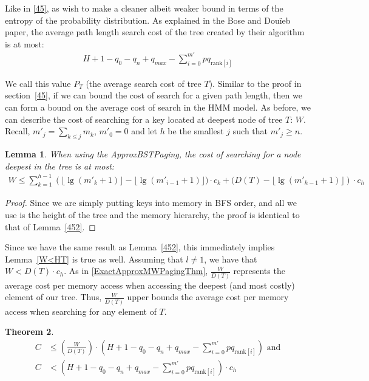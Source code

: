 \documentclass[letterpaper,12pt,titlepage,oneside,final]{book}
\theoremstyle{plain}
\newtheorem{thm}{Theorem}[section]
\newtheorem{lem}[thm]{Lemma}
\begin{document}
Like in \ref{45}, as wish to make a cleaner albeit weaker bound in terms of the entropy of the probability distribution. As explained in the Bose and Dou\"{i}eb paper, the average path length search cost of the tree created by their algorithm is at most: \cite{bose2009efficient}
\begin{align*}
H + 1 - q_0 - q_n + q_{max} - \sum_{i=0}^{m'} pq_{\text{rank}[i]}
\end{align*}

We call this value $P_T$ (the average search cost of tree $T$). Similar to the proof in section~\ref{45}, if we can bound the cost of search for a given path length, then we can form a bound on the average cost of search in the HMM model. As before, we can describe the cost of searching for a key located at deepest node of tree $T$: $W$. Recall, $m'_j = \sum_{k \leq j} m_k$, $m'_0 = 0$ and let $h$ be the smallest $j$ such that $m'_j \geq n$.

\begin{lem} 
When using the ApproxBSTPaging, the cost of searching for a node deepest in the tree is at most:
\begin{align*}
W \leq \sum_{k=1}^{h-1} \left(\lfloor \lg(m'_k+1) \rfloor - \lfloor \lg(m'_{i-1}+1) \rfloor)\cdot c_k+ (D(T) - \lfloor \lg(m'_{h-1}+1) \rfloor \right)\cdot c_h
\end{align*}
\end{lem}

\begin{proof}
Since we are simply putting keys into memory in BFS order, and all we use is the height of the tree and the memory hierarchy, the proof is identical to that of Lemma~\ref{452}.
\end{proof}

Since we have the same result as Lemma~\ref{452}, this immediately implies Lemma~\ref{W<HT} is true as well. Assuming that $l \neq 1$, we have that $W<D(T)\cdot c_h$. As in \ref{ExactApproxMWPagingThm}, $\frac{W}{D(T)}$ represents the average cost per memory access when accessing the deepest (and most costly) element of our tree. Thus, $\frac{W}{D(T)}$ upper bounds the average cost per memory access when searching for any element of $T$.
\\

\begin{thm} \label{ApproxBSTThm}
\begin{align*}
C &\leq  (\frac{W}{D(T)}) \cdot  (H + 1 - q_0 - q_n + q_{max} - \sum_{i=0}^{m'} pq_{\text{rank}[i]}) \text{ and} \\
C &<  (H + 1 - q_0 - q_n + q_{max} - \sum_{i=0}^{m'} pq_{\text{rank}[i]})\cdot c_h
\end{align*}
\end{thm}
\end{document}
